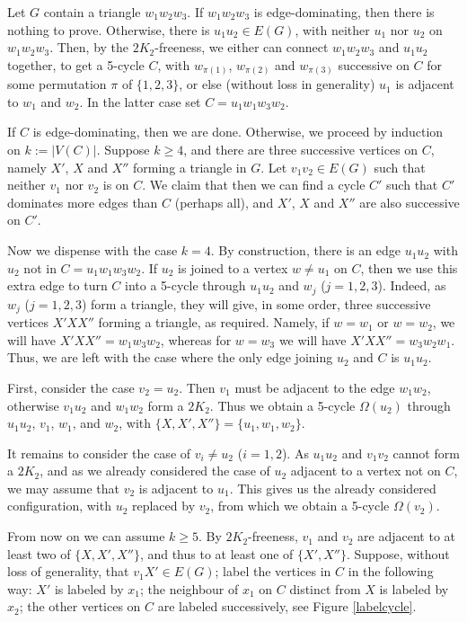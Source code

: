 \documentclass[runningheads,a4paper]{llncs}
\begin{document}
Let $G$  contain a triangle $w_1w_2w_3$.  If $w_1w_2w_3$ is edge-dominating,
then there is nothing to prove. Otherwise, there is $u_1u_2\in
E(G)$, with neither $u_1$ nor $u_2$  on $w_1w_2w_3$.  Then, by the
$2K_2$-freeness, we either can connect $w_1w_2w_3$ and $u_1u_2$ together, to get a
5-cycle $C$, with $w_{\pi(1)}$, $w_{\pi(2)}$ and $w_{\pi(3)}$ successive on $C$
for some permutation $\pi$ of $\{1,2,3\}$, or else (without loss in generality)
$u_1$ is adjacent to $w_1$ and $w_2$. In the latter case set $C=u_1w_1w_3w_2$.

If $C$ is edge-dominating, then we are done. Otherwise, we proceed by induction on
$k:=|V(C)|$.
Suppose $k\ge 4$, and there are three successive vertices on $C$, namely $X'$, $X$ and $X''$ forming a triangle in $G$.
Let $v_1v_2\in E(G)$ such that neither $v_1$ nor $v_2$ is on $C$.
We claim that then we can find a cycle $C'$ such that $C'$ dominates more edges than $C$ (perhaps all),
and $X'$, $X$ and $X''$ are also successive on $C'$.

Now we dispense with the case $k=4$. By construction, there is an edge $u_1u_2$
with $u_2$ not in $C=u_1w_1w_3w_2$. If $u_2$ is joined to a vertex $w\neq u_1$ on $C$,
then we use this extra edge to turn $C$ into a 5-cycle through $u_1u_2$
and $w_j$ ($j=1,2,3$). Indeed, as $w_j$ ($j=1,2,3$) form a triangle, they will give,
in some order, three successive vertices $X'XX''$ forming a triangle, as required.
Namely, if $w=w_1$ or $w=w_2$, we will have $X'XX''=w_1w_3w_2$, whereas for $w=w_3$
we will have $X'XX''=w_3w_2w_1$.
Thus, we are left with the case where the only edge joining $u_2$ and $C$ is $u_1u_2$.

First, consider the case $v_2=u_2$. Then $v_1$ must be adjacent to the edge $w_1w_2$,
otherwise $v_1u_2$ and $w_1w_2$ form a $2K_2$. Thus we obtain a 5-cycle $\Omega(u_2)$
through $u_1u_2$, $v_1$, $w_1$, and $w_2$, with $\{X,X',X''\}=\{u_1,w_1,w_2\}$.

It remains to consider the case of $v_i\neq u_2$ ($i=1,2$).
As $u_1u_2$ and $v_1v_2$ cannot form a $2K_2$, and as we already considered
the case of $u_2$ adjacent to a vertex not on $C$, we may assume that
$v_2$ is adjacent to $u_1$. This gives us the already considered configuration,
with $u_2$ replaced by $v_2$, from which we obtain a 5-cycle $\Omega(v_2)$.

\medskip

From now on we can assume $k\geq 5$.
By $2K_2$-freeness, $v_1$ and $v_2$ are adjacent to at least two of $\{X,X',X''\}$,
and thus to at least one of $\{X',X''\}$.  Suppose,
without loss of generality, that $v_1X'\in E(G)$; label the vertices in $C$ in the following way:
$X'$ is labeled by $x_1$; the neighbour of $x_1$ on $C$ distinct from $X$ is labeled by $x_2$;
the other vertices on $C$ are labeled successively, see Figure \ref{labelcycle}.
\end{document}
